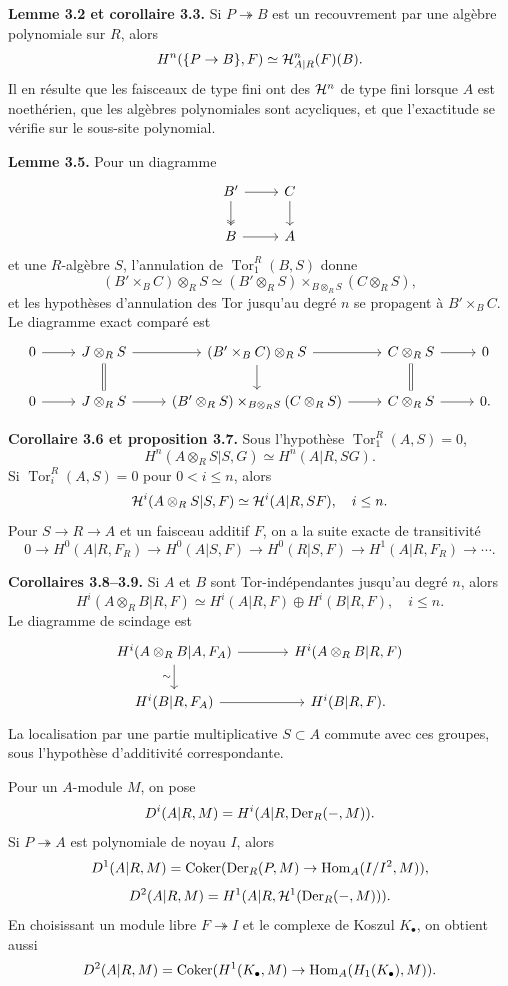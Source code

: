 \documentclass[11pt]{article}
\providecommand{\Tor}{\operatorname{Tor}}
\providecommand{\Hom}{\operatorname{Hom}}
\begin{document}
\textbf{Lemme 3.2 et corollaire 3.3.}  Si \(P\twoheadrightarrow B\) est un recouvrement par une algèbre polynomiale sur \(R\), alors
\[
H^n(\{P\to B\},F)\simeq\mathcal H^n_{A|R}(F)(B).
\]
Il en résulte que les faisceaux de type fini ont des \(\mathcal H^n\) de type fini lorsque \(A\) est noethérien, que les algèbres polynomiales sont acycliques, et que l'exactitude se vérifie sur le sous-site polynomial.

\textbf{Lemme 3.5.}  Pour un diagramme
\[
\begin{tikzcd}
B' \arrow[r] \arrow[d,two heads] & C \arrow[d] \\
B \arrow[r] & A
\end{tikzcd}
\]
et une \(R\)-algèbre \(S\), l'annulation de \(\Tor^R_1(B,S)\) donne
\[
(B'\times_BC)\otimes_RS\simeq(B'\otimes_RS)\times_{B\otimes_RS}(C\otimes_RS),
\]
et les hypothèses d'annulation des Tor jusqu'au degré \(n\) se propagent à \(B'\times_BC\).  Le diagramme exact comparé est
\[
\begin{tikzcd}
0\arrow[r]&J\otimes_RS\arrow[r]\arrow[d,equal]&(B'\times_BC)\otimes_RS\arrow[r]\arrow[d]&C\otimes_RS\arrow[r]\arrow[d,equal]&0\\
0\arrow[r]&J\otimes_RS\arrow[r]&(B'\otimes_RS)\times_{B\otimes_RS}(C\otimes_RS)\arrow[r]&C\otimes_RS\arrow[r]&0.
\end{tikzcd}
\]

\textbf{Corollaire 3.6 et proposition 3.7.}  Sous l'hypothèse \(\Tor^R_1(A,S)=0\),
\[
H^n(A\otimes_RS|S,G)\simeq H^n(A|R,SG).
\]
Si \(\Tor_i^R(A,S)=0\) pour \(0<i\le n\), alors
\[
\mathcal H^i(A\otimes_RS|S,F)\simeq\mathcal H^i(A|R,SF),\quad i\le n.
\]
Pour \(S\to R\to A\) et un faisceau additif \(F\), on a la suite exacte de transitivité
\[
0\to H^0(A|R,F_R)\to H^0(A|S,F)\to H^0(R|S,F)\to H^1(A|R,F_R)\to\cdots .
\]

\textbf{Corollaires 3.8--3.9.}  Si \(A\) et \(B\) sont Tor-indépendantes jusqu'au degré \(n\), alors
\[
H^i(A\otimes_RB|R,F)\simeq H^i(A|R,F)\oplus H^i(B|R,F),\quad i\le n.
\]
Le diagramme de scindage est
\[
\begin{tikzcd}[column sep=large]
H^i(A\otimes_RB|A,F_A) \arrow[r] \arrow[d,"\sim"'] & H^i(A\otimes_RB|R,F) \\
H^i(B|R,F_A) \arrow[r] & H^i(B|R,F).
\end{tikzcd}
\]
La localisation par une partie multiplicative \(S\subset A\) commute avec ces groupes, sous l'hypothèse d'additivité correspondante.

Pour un \(A\)-module \(M\), on pose
\[
D^i(A|R,M)=H^i(A|R,\operatorname{Der}_R(-,M)).
\]
Si \(P\twoheadrightarrow A\) est polynomiale de noyau \(I\), alors
\[
D^1(A|R,M)=\Coker(\Der_R(P,M)\to\Hom_A(I/I^2,M)),
\]
\[
D^2(A|R,M)=H^1(A|R,\mathcal H^1(\operatorname{Der}_R(-,M))).
\]
En choisissant un module libre \(F\twoheadrightarrow I\) et le complexe de Koszul \(K_\bullet\), on obtient aussi
\[
D^2(A|R,M)=\Coker(H^1(K_\bullet,M)\to\Hom_A(H_1(K_\bullet),M)).
\]
\end{document}
